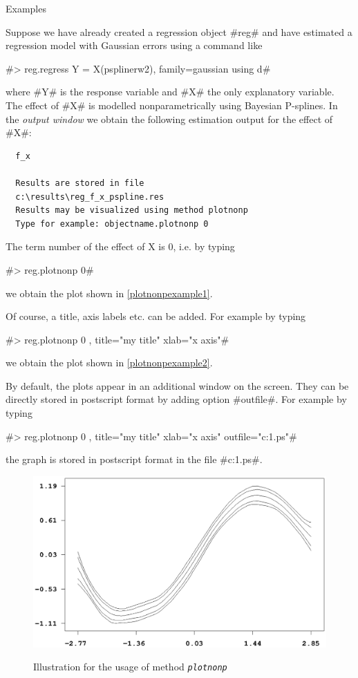 \begin{stanza}{Examples}

Suppose we have already created a regression object #reg# and have
estimated a regression model with Gaussian errors using a command
like

#> reg.regress Y = X(psplinerw2), family=gaussian using d#

where #Y# is the response variable and #X# the only explanatory
variable. The effect of #X# is modelled nonparametrically using
Bayesian P-splines. In the {\em output window} we obtain the
following estimation output for the effect of #X#:

\begin{verbatim}
  f_x

  Results are stored in file
  c:\results\reg_f_x_pspline.res
  Results may be visualized using method plotnonp
  Type for example: objectname.plotnonp 0
\end{verbatim}

The term number of the effect of X is 0, i.e. by typing

#> reg.plotnonp 0#

we obtain the plot shown in \autoref{plotnonpexample1}.

Of course, a title, axis labels etc. can be added. For example by
typing

#> reg.plotnonp 0 , title="my title" xlab="x axis"#

we obtain the plot shown in \autoref{plotnonpexample2}.

By default, the plots appear in an additional window on the
screen. They can be directly stored in postscript format by adding
option #outfile#. For example by typing

 #> reg.plotnonp 0 , title="my title" xlab="x axis" outfile="c:\results\result1.ps"#

the graph is stored in postscript format in the file
#c:\results\result1.ps#.


\begin{figure}[ht]
\begin{center}
\includegraphics[scale=0.8]{grafiken/plotnonpexample.ps}
{\em\caption{ \label{plotnonpexample1} Illustration for the usage
of method \em\tt plotnonp}}
\end{center}
\end{figure}



\end{stanza}

